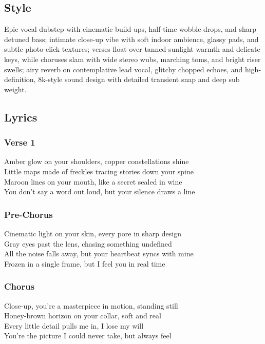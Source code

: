 \subsection{Style}\label{style-14}

Epic vocal dubstep with cinematic build-ups, half-time wobble drops, and
sharp detuned bass; intimate close-up vibe with soft indoor ambience,
glassy pads, and subtle photo-click textures; verses float over
tanned-sunlight warmth and delicate keys, while choruses slam with wide
stereo wubs, marching toms, and bright riser swells; airy reverb on
contemplative lead vocal, glitchy chopped echoes, and high-definition,
8k-style sound design with detailed transient snap and deep sub weight.

\subsection{Lyrics}\label{lyrics-14}

\subsubsection{Verse 1}\label{verse-1-7}

Amber glow on your shoulders, copper constellations shine\\
Little maps made of freckles tracing stories down your spine\\
Maroon lines on your mouth, like a secret sealed in wine\\
You don't say a word out loud, but your silence draws a line

\subsubsection{Pre-Chorus}\label{pre-chorus-6}

Cinematic light on your skin, every pore in sharp design\\
Gray eyes past the lens, chasing something undefined\\
All the noise falls away, but your heartbeat syncs with mine\\
Frozen in a single frame, but I feel you in real time

\subsubsection{Chorus}\label{chorus-18}

Close-up, you're a masterpiece in motion, standing still\\
Honey-brown horizon on your collar, soft and real\\
Every little detail pulls me in, I lose my will\\
You're the picture I could never take, but always feel

